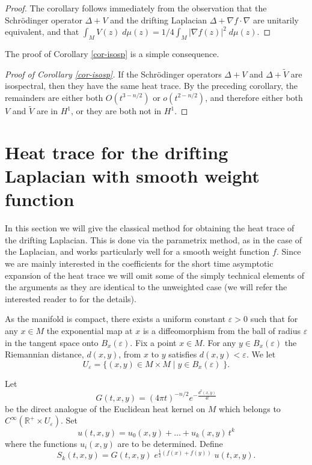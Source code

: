\documentclass[letterpaper,12pt]{amsart}
\newcommand{\eps}{\varepsilon}
\begin{document}
\begin{proof}
The corollary follows immediately from the observation that the Schr\"odinger operator $\Delta + V$ and the drifting Laplacian $\Delta + \nabla f \cdot \nabla$ are unitarily equivalent, and that $\int_M V(z)  \; d\mu(z) =  1/4  \int_M | \nabla f(z)|^2 \;d\mu(z)$.
\end{proof}

The proof of Corollary \ref{cor-isosp} is a simple consequence.
\begin{proof}[Proof of Corollary \ref{cor-isosp}]
If the Schr\"odinger operators $\Delta + V$ and $\Delta + \tilde{V}$ are isospectral, then they have the same heat trace.  By the preceding corollary, the remainders are either both $O(t^{3-n/2})$ or $o(t^{2-n/2})$, and therefore either both $V$ and $\tilde V$ are in $H^1$, or they are both not in $H^1$.
\end{proof}

\section{Heat trace for the drifting Laplacian with smooth weight function} \label{S4}
In this section we will give the classical method for obtaining the heat trace of the drifting Laplacian.   This is done via the parametrix method, as in the case of the Laplacian, and works particularly well for a smooth weight function $f$. Since we are mainly interested in the coefficients for the short time asymptotic expansion of the heat trace we will omit some of the simply technical elements of the arguments as they are identical to the unweighted case (we will refer the interested reader to \cite{Ro} for the details).

As the manifold is compact, there exists a uniform constant $\eps>0$ such that for any $x\in M$ the exponential map at $x$ is a diffeomorphism from the ball of radius $\eps$ in the tangent space onto $B_x(\eps)$. Fix a point $x\in M$. For any $y \in B_x(\eps)$ the Riemannian distance, $d(x,y)$, from $x$ to $y$ satisfies $d(x,y)<\eps$.  We let \[
U_\eps = \{ (x,y) \in M\times M \;  | \;  y \in B_x(\eps)\;\}.
\]

Let
\[
G(t,x,y) =(4\pi t)^{-n/2} e^{-\frac{d^2(x,y)}{4t}}
\]
be the direct analogue of the Euclidean heat kernel on $M$ which belongs to $C^\infty (\mathbb{R}^+\times U_\eps)$. Set
\[
u(t,x,y)=  u_0(x,y) + \ldots + u_k(x,y) \,t^k
\]
where the functions $u_i(x,y)$ are to be determined. Define
\[
S_k(t,x,y) =  G(t,x,y) \; e^{\frac 12 (f(x)+f(y))}  \; u(t,x,y).
\]
\end{document}
